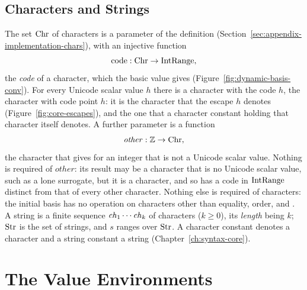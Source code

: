 \subsection{Characters and Strings}\label{sec:appendix-dynamic-basis-chars}

The set $\mathrm{Chr}$ of characters is a parameter of the definition
(Section~\ref{sec:appendix-implementation-chars}), with an injective function
\[
  \mathrm{code}:\mathrm{Chr}\to\mathrm{IntRange},
\]
the \emph{code} of a character, which the basic value  gives
(Figure~\ref{fig:dynamic-basis-conv}). For every Unicode scalar value $h$
there is a character with the code $h$, the character with code point $h$:
it is the character that the escape $h$\kw{\kwrb}
denotes (Figure~\ref{fig:core-escapes}), and the one that a character
constant holding that character itself denotes. A further parameter is a
function
\[
  \mathit{other}:\mathbb{Z}\to\mathrm{Chr},
\]
the character that  gives for an integer that is not a
Unicode scalar value. Nothing is required of $\mathit{other}$: its result may
be a character that is no Unicode scalar value, such as a lone surrogate, but
it is a character, and so has a code in $\mathrm{IntRange}$ distinct from that of
every other character. Nothing else is required of characters: the initial
basis has no operation on characters other than equality, order,
 and . %
A string is a finite sequence $\mathit{ch}_1\cdots\mathit{ch}_k$ of characters
($k\geq 0$), its \emph{length} being $k$; $\mathrm{Str}$ is the set of strings, and
$s$ ranges over $\mathrm{Str}$. A character constant denotes a character and a
string constant a string (Chapter~\ref{ch:syntax-core}). %

\section{The Value Environments}\label{sec:appendix-dynamic-basis-env}

